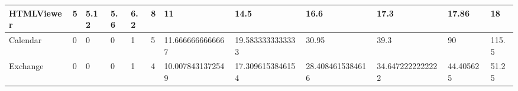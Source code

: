 \documentclass[a4paper]{article}
\begin{document}
\newline
\begin{tabular}{|l|l|l|l|l|l|l|l|l|l|l|l|}
\hline
HTMLViewer&5&5.12&5.6&6.2&8&11&14.5&16.6&17.3&17.86&18\\
\hline
Calendar&0&0&0&1&5&11.6666666666667&19.5833333333333&30.95&39.3&90&115.5\\
\hline
Exchange&0&0&0&1&4&10.0078431372549&17.3096153846154&28.4084615384616&34.6472222222222&44.405625&51.25\\
\hline
\end{tabular}
\end{document}
